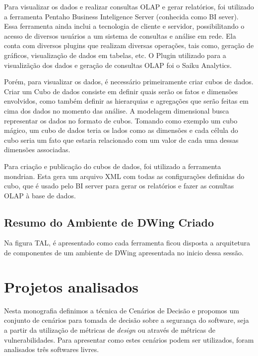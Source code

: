 Para visualizar os dados e realizar consultas OLAP e gerar relatórios, foi utilizado a ferramenta Pentaho Business Inteligence Server (conhecida como BI sever). Essa ferramenta ainda inclui a tecnologia de cliente e servidor, possibilitando o acesso de diversos usuários a um sistema de consultas e análise em rede. Ela conta com diversos plugins que realizam diversas operações, tais como, geração de gráficos, visualização de dados em tabelas, etc. O Plugin utilizado para a visualizãção dos dados e geração de consultas OLAP foi o Saiku Analytics.

Porém, para visualizar os dados, é necessário primeiramente criar cubos de dados. Criar um Cubo de dados consiste em definir quais serão os fatos e dimensões envolvidos, como também definir as hierarquias e agregações que serão feitas em cima dos dados no momento das análise. A modelagem dimensional busca representar os dados no formato de cubos. Tomando como exemplo um cubo mágico, um cubo de dados teria os lados como as dimensões e cada célula do cubo seria um fato que estaria relacionado com um valor de cada uma dessas dimensões associadas.


Para criação e publicação do cubos de dados, foi utilizado a ferramenta mondrian. Esta gera um arquivo XML com todas as configurações definidas do cubo, que é usado pelo BI server para gerar os relatórios e fazer as conultas OLAP à base de dados.


\subsection{Resumo do Ambiente de DWing Criado}

Na figura TAL, é apresentado como cada ferramenta ficou disposta a arquitetura de componentes de um ambiente de DWing apresentada no inicio dessa sessão.



\section{Projetos analisados}
\label{cap-projects}

Nesta monografia definimos a técnica de Cenários de Decisão e propomos um conjunto de cenários para tomada de decisão sobre a segurança do software, seja a partir da utilização de métricas de \emph{design} ou através de métricas de vulnerabilidades. Para apresentar como estes cenários podem ser utilizados, foram analisados três softwares livres. 

